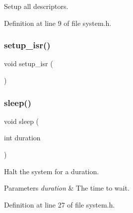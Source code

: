 Setup all descriptors. 



Definition at line 9 of file system.\+h.

\mbox{\label{a00032_a4971467ce19d8fc5727191e1b7fe16b4_a4971467ce19d8fc5727191e1b7fe16b4}} 
\subsubsection{\texorpdfstring{setup\+\_\+isr()}{setup\_isr()}}
{\footnotesize\ttfamily void setup\+\_\+isr (\begin{DoxyParamCaption}{ }\end{DoxyParamCaption})}

\mbox{\label{a00032_afcc76b3d055f3137e37a9c1ce82d0b95_afcc76b3d055f3137e37a9c1ce82d0b95}} 
\subsubsection{\texorpdfstring{sleep()}{sleep()}}
{\footnotesize\ttfamily void sleep (\begin{DoxyParamCaption}\item[{int}]{duration }\end{DoxyParamCaption})}



Halt the system for a duration. 


\begin{DoxyParams}{Parameters}
{\em duration} & The time to wait. \\
\hline
\end{DoxyParams}


Definition at line 27 of file system.\+h.

